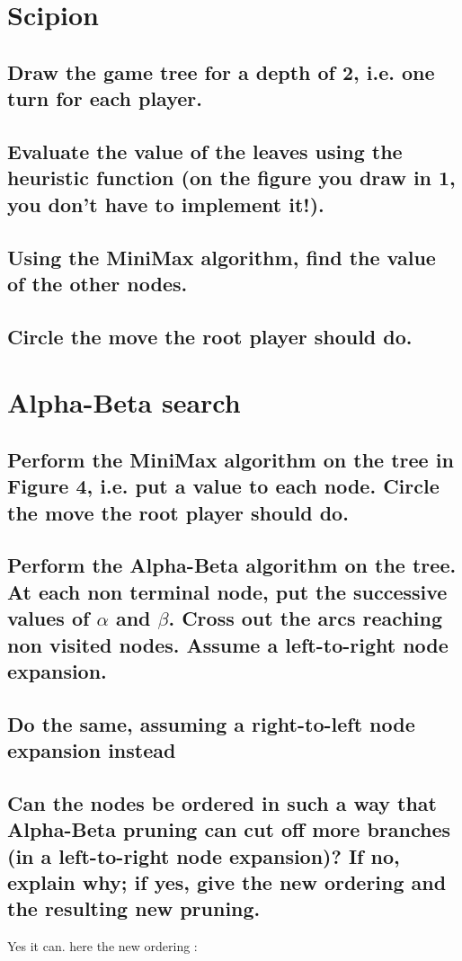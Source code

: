 \documentclass[a4paper,10pt]{article}
\begin{document}
	\newpage
	

	\section{Scipion}
	
		\subsection{Draw the game tree for a depth of 2, i.e. one turn for each player.}
		\subsection{Evaluate the value of the leaves using the heuristic function (on the figure you
draw in 1, you don’t have to implement it!).}
		\subsection{Using the MiniMax algorithm, find the value of the other nodes.}
		\subsection{Circle the move the root player should do.}
		
	\section{Alpha-Beta search}	
		\subsection{Perform the MiniMax algorithm on the tree in Figure 4, i.e. put a value to each node. Circle the move the root player should do.}
		\subsection{Perform the Alpha-Beta algorithm on the tree. At each non terminal node, put the successive values of $\alpha$ and $\beta$. Cross out the arcs reaching non visited nodes. Assume a left-to-right node expansion.}
		\subsection{Do the same, assuming a right-to-left node expansion instead}
		\subsection{Can the nodes be ordered in such a way that Alpha-Beta pruning can cut off more branches (in a left-to-right node expansion)? If no, explain why; if yes,
give the new ordering and the resulting new pruning.}
		Yes it can. here the new ordering :
\end{document}
